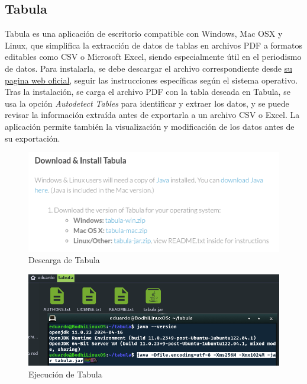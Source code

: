 \documentclass[12pt]{article}
\begin{document}
                \subsection{Tabula}
                        Tabula es una aplicación de escritorio compatible con Windows, Mac OSX y Linux, que simplifica la extracción de datos de tablas en archivos PDF a formatos editables como CSV o Microsoft Excel, siendo especialmente útil en el periodismo de datos. Para instalarla, se debe descargar el archivo correspondiente desde \href{https://tabula.technology/ }{\uline{su pagina web oficial}}, seguir las instrucciones específicas según el sistema operativo. Tras la instalación, se carga el archivo PDF con la tabla deseada en Tabula, se usa la opción \textit{Autodetect Tables} para identificar y extraer los datos, y se puede revisar la información extraída antes de exportarla a un archivo CSV o Excel. La aplicación permite también la visualización y modificación de los datos antes de su exportación.

                        \newpage
                        \begin{figure}[!h]
                                \centering
                                \includegraphics[width=1\textwidth]{img/tabula-1.png}
                                \caption{Descarga de Tabula}
                        \end{figure}

                        \begin{figure}[!h]
                                \centering
                                \includegraphics[width=1\textwidth]{img/tabula-2.png}
                                \caption{Ejecución de Tabula}
                        \end{figure}
\end{document}
